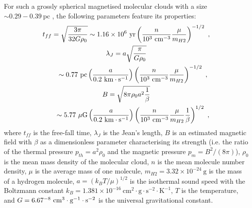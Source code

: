 \documentclass[fleqn,usenatbib]{mnras}
\begin{document}
For such a grossly spherical magnetised molecular clouds with a size $\sim 0.29-0.39~\mathrm{pc}$ \citep{klessen2001formation}, the following parameters feature its properties:
\begin{gather}
t_{ff}=\sqrt{\frac{3\pi}{32G\rho_{0}}}\sim 1.16\times 10^{6}~\mathrm{yr} \left(\frac{n}{10^{3}~\mathrm{cm^{-3}}}
 \frac{\mu}{m_{H2}}\right)^{-1/2}\ ,\\
\lambda_{J}=a\sqrt{\frac{\pi}{G\rho_{0}}}\notag \\
\qquad\sim 0.77~{\rm pc}\left(\frac{a}{0.2~\mathrm{km\cdot s^{-1}}}\right)\left(\frac{n}{10^{3}~\mathrm{cm^{-3}}}
 \frac{\mu}{m_{H2}}\right)^{-1/2}\ ,\\
B=\sqrt{8\pi\rho_{0} a^{2}\frac{1}{\beta}}\notag \\
\qquad\sim 5.77~\mathrm{\mu G}\left(\frac{a}{0.2~\mathrm{km\cdot s^{-1}}}\right)\left(\frac{n}{10^{3}~\mathrm{cm^{-3}}}
\frac{\mu}{m_{H2}}\frac{1}{\beta}\right)^{1/2}\ ,\label{e43}
\end{gather}
where $t_{ff}$ is the free-fall time, $\lambda_{J}$ is the Jean's length, $B$ is an estimated magnetic field with $\beta$ as a dimensionless parameter characterising its strength 
(i.e. the ratio of the thermal pressure $p_{th}=a^{2}\rho_{0}$ and the magnetic pressure $p_{m}=B^{2}/(8\pi)$), $\rho_{0}$ is the mean mass density of the molecular cloud, $n$ is the mean molecule number density, $\mu$ is the average mass of one molecule, $m_{H2}=3.32\times 10^{-24}~\mathrm{g}$ is the mass of a hydrogen molecule, $a=\left(k_{B}T/\mu\right)^{1/2}$ is the isothermal sound speed with the Boltzmann constant $k_{B}=1.381\times 10^{-16}~\mathrm{cm^{2}\cdot g\cdot s^{-2}\cdot K^{-1}}$, $T$ is the temperature, and $G=6.67\time 10^{-8}~\mathrm{cm^{3}\cdot g^{-1}\cdot s^{-2}}$ is the universal gravitational constant.
\end{document}
